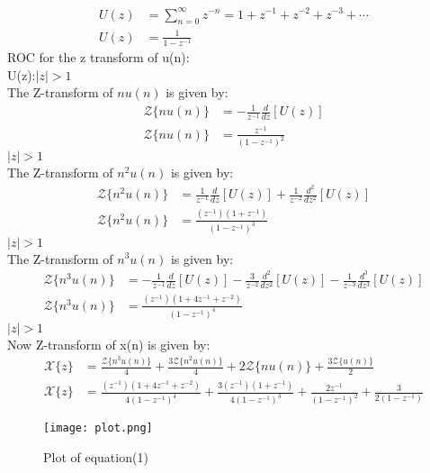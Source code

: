 \documentclass{article}
\begin{document}
\begin{align}
U(z) &= \sum_{n=0}^{\infty} z^{-n} = 1 + z^{-1} + z^{-2} + z^{-3} + \dotsb  \\
U(z) &= \frac{1}{1- z^{-1}}
\end{align}
ROC for the z transform of u(n):\\
 U(z):$\lvert z \rvert > 1$\\
The Z-transform of $nu(n)$ is given by:
\begin{align}
\mathcal{Z}\{nu(n)\} &= -\frac{1}{z^{-1}} \frac{d}{dz}[U(z)]\\
\mathcal{Z}\{nu(n)\} &= \frac{z^{-1}}{(1 - z^{-1})^2}
\end{align}
 $\lvert z \rvert > 1$\\
The Z-transform of $n^2u(n)$ is given by:
\begin{align}
\mathcal{Z}\{n^2u(n)\} &= \frac{1}{z^{-1}} \frac{d}{dz}[U(z)] + \frac{1}{z^{-2}} \frac{d^2}{dz^2}[U(z)]\\
\mathcal{Z}\{n^2u(n)\} &= \frac{(z^{-1})(1+z^{-1})}{(1-z^{-1})^3}
\end{align}
 $\lvert z \rvert > 1$\\
The Z-transform of $n^3u(n)$ is given by:
\begin{align}
\mathcal{Z}\{n^3u(n)\} &= -\frac{1}{z^{-1}} \frac{d}{dz}[U(z)] - \frac{3}{z^{-2}} \frac{d^2}{dz^2}[U(z)] - \frac{1}{z^{-3}} \frac{d^3}{dz^3}[U(z)]\\
\mathcal{Z}\{n^3u(n)\} &= \frac{(z^{-1})(1+4z^{-1}+z^{-2})}{(1-z^{-1})^4}
\end{align}
 $\lvert z \rvert > 1$\\
Now Z-transform of x(n) is given by:
\begin{align}
\mathcal{X}\{z\} &=\frac{\mathcal{Z}\{n^3u(n)\}}{4} +\frac{3\mathcal{Z}\{n^2u(n)\}}{4} +2\mathcal{Z}\{nu(n)\} +\frac{3\mathcal{Z}\{u(n)\}}{2}\\
\mathcal{X}\{z\} &=\frac{(z^{-1})(1+4z^{-1}+z^{-2})}{4(1-z^{-1})^4} +\frac{3(z^{-1})(1+z^{-1})}{4(1-z^{-1})^3} +\frac{2z^{-1}}{(1 - z^{-1})^2} +\frac{3}{2(1- z^{-1})}
\end{align}
\newpage


\begin{figure}
    \centering
    \texttt{[image: plot.png]}
    \caption{Plot of equation(1)}
    \label{fig:plot}
\end{figure}
\end{document}
